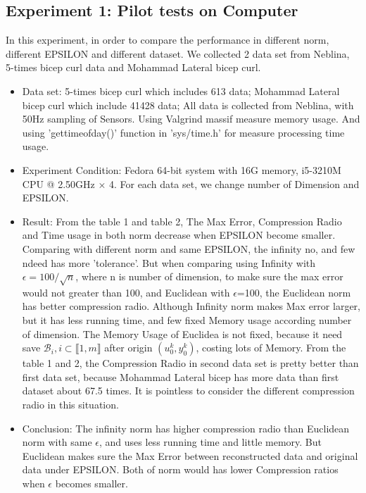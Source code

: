 \documentclass[10pt, conference, compsocconf]{IEEEtran}
\begin{document}
\subsection{Experiment 1: Pilot tests on Computer}
In this experiment, in order to compare the performance in different norm, different EPSILON and different dataset. We collected 2 data set from Neblina, 5-times bicep curl data and Mohammad Lateral bicep curl.
\begin{itemize}
    \item Data set: 5-times bicep curl which includes 613 data;
                    Mohammad Lateral bicep curl which include 41428 data;
                    All data is collected from Neblina, with 50Hz sampling of Sensors.
                    Using Valgrind massif measure memory usage. And using 'gettimeofday()' function in 'sys/time.h' for measure processing time usage.
    \item Experiment Condition: Fedora 64-bit system with 16G memory, i5-3210M CPU @ 2.50GHz × 4. For each data set, we change number of Dimension and EPSILON.
    \item Result: From the table 1 and table 2, The Max Error, Compression Radio and Time usage in both norm decrease when EPSILON become smaller. Comparing with different norm and same EPSILON, the infinity no, and few ndeed has more 'tolerance'. But when comparing using Infinity with $\epsilon=100/\sqrt{n}$, where n is number of dimension, to make sure the max error would not greater than 100, and Euclidean with $\epsilon$=100, the Euclidean norm has better compression radio. Although Infinity norm makes Max error larger, but it has less running time, and few fixed Memory usage according number of dimension. The Memory Usage of Euclidea is not fixed, because it need save $\mathcal{B}_i, i\subset\llbracket 1, m \rrbracket$ after origin $(u_0^k, y_0^k)$, costing lots of Memory. From the table 1 and 2, the Compression Radio in second data set is pretty better than first data set, because Mohammad Lateral bicep has more data than first dataset about 67.5 times. It is pointless to consider the different compression radio in this situation.

    \item Conclusion: The infinity norm has higher compression radio than Euclidean norm with same $\epsilon$, and uses less running time and little memory. But Euclidean makes sure the Max Error between reconstructed data and original data under EPSILON. Both of norm would has lower Compression ratios when $\epsilon$ becomes smaller.
\end{itemize}
\end{document}
